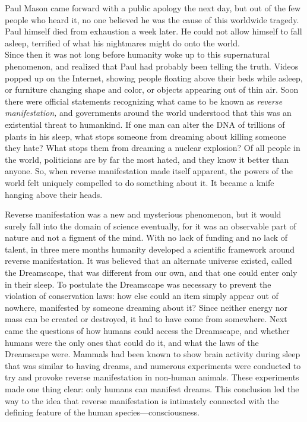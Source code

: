 \documentclass[openany, oneside]{book}
\begin{document}
Paul Mason came forward with a public apology the next day, but out of the few people who heard it, no one believed he was the cause of this worldwide tragedy.
Paul himself died from exhaustion a week later.
He could not allow himself to fall asleep, terrified of what his nightmares might do onto the world.\\

Since then it was not long before humanity woke up to this supernatural phenomenon, and realized that Paul had probably been telling the truth.
Videos popped up on the Internet, showing people floating above their beds while asleep, or furniture changing shape and color, or objects appearing out of thin air.
Soon there were official statements recognizing what came to be known as \emph{reverse manifestation,} and governments around the world understood that this was an existential threat to humankind.
If one man can alter the DNA of trillions of plants in his sleep, what stops someone from dreaming about killing someone they hate?
What stops them from dreaming a nuclear explosion?
Of all people in the world, politicians are by far the most hated, and they know it better than anyone.
So, when reverse manifestation made itself apparent, the powers of the world felt uniquely compelled to do something about it.
It became a knife hanging above their heads.

Reverse manifestation was a new and mysterious phenomenon, but it would surely fall into the domain of science eventually, for it was an observable part of nature and not a figment of the mind.
With no lack of funding and no lack of talent, in three mere months humanity developed a scientific framework around reverse manifestation.
It was believed that an alternate universe existed, called the Dreamscape, that was different from our own, and that one could enter only in their sleep.
To postulate the Dreamscape was necessary to prevent the violation of conservation laws: how else could an item simply appear out of nowhere, manifested by someone dreaming about it?
Since neither energy nor mass can be created or destroyed, it had to have come from somewhere.
Next came the questions of how humans could access the Dreamscape, and whether humans were the only ones that could do it, and what the laws of the Dreamscape were.
Mammals had been known to show brain activity during sleep that was similar to having dreams, and numerous experiments were conducted to try and provoke reverse manifestation in non-human animals.
These experiments made one thing clear: only humans can manifest dreams.
This conclusion led the way to the idea that reverse manifestation is intimately connected with the defining feature of the human species---consciousness.
\end{document}
